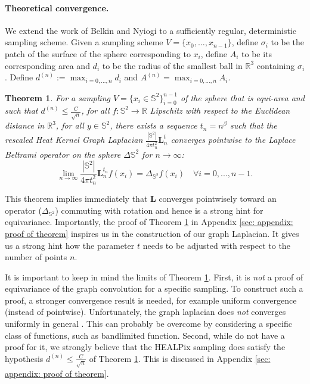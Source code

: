 \documentclass{article} %
\newtheorem{theorem}{Theorem}[section]
\renewcommand{\b}[1]{{\bm{#1}}}   %
\begin{document}
\paragraph{Theoretical convergence.}
We extend the work of Belkin and Nyiogi to a sufficiently regular, deterministic sampling scheme. 
Given a sampling scheme $V = \{x_0, \dots, x_{n-1}\}$, define $\sigma_i$ to be the patch of the surface of the sphere corresponding to $x_i$, define $A_i$ to be its corresponding area and $d_i$ to be the radius of the smallest ball in $\mathbb R^3$ containing $\sigma_i$. Define $d^{(n)} := \max_{i=0, \dots, n}d_i$ and $A^{(n)}=\max_{i=0, \dots, n}A_i$.
\begin{theorem}
	For a sampling $V = \{x_i\in\mathbb S^2\}_{i=0}^{n-1}$ of the sphere that is equi-area and such that $d^{(n)} \leq \frac{C}{\sqrt{n}}$, for all $f: \mathbb S^2 \rightarrow \mathbb R$ Lipschitz with respect to the Euclidean distance in $\mathbb R^3$, for all $y\in\mathbb S^2$, there exists a sequence $t_n = n^\beta$ such that the rescaled Heat Kernel Graph Laplacian $\frac{|\mathbb S^2|}{4\pi t_n^2}\b {L}^t_n$ converges pointwise to the Laplace Beltrami operator on the sphere $\Delta{\mathbb S^2}$  for $n\to\infty$:
	$$ \lim_{n\to\infty} \frac{|\mathbb{S}^2|}{4\pi t_n^2} \b{L}_n^{t_n} f(x_i) =  \Delta_{\mathbb{S}^2}f(x_i)\quad \forall i=0, ..., n-1.$$
	\label{theo:pointwise convergence for a regular sampling}
\end{theorem}
This theorem implies immediately that $\b{L}$ converges pointwisely toward an operator ($\Delta_{\mathbb S^2}$) commuting with rotation and hence is a strong hint for equivariance.
Importantly, the proof of Theorem \ref{theo:pointwise convergence for a regular sampling} in Appendix \ref{sec: appendix: proof of theorem} inspires us in the construction of our graph Laplacian. It gives us a strong hint how the parameter $t$ needs to be adjusted with respect to the number of points $n$.

It is important to keep in mind the limits of Theorem \ref{theo:pointwise convergence for a regular sampling}.
First, it is \emph{not} a proof of equivariance of the graph convolution for a specific sampling. To construct such a proof, a stronger convergence result is needed, for example uniform convergence (instead of pointwise).
Unfortunately, the graph laplacian does \emph{not} converges uniformly in general \cite{belkin2007convergence}. This can probably be overcome by considering a specific class of functions, such as bandlimited function.
Second, while do not have a proof for it, we strongly believe that the HEALPix sampling does satisfy the hypothesis $d^{(n)}\leq \frac{C}{\sqrt{n}}$ of Theorem \ref{theo:pointwise convergence for a regular sampling}. This is discussed in Appendix \ref{sec: appendix: proof of theorem}.
\end{document}
